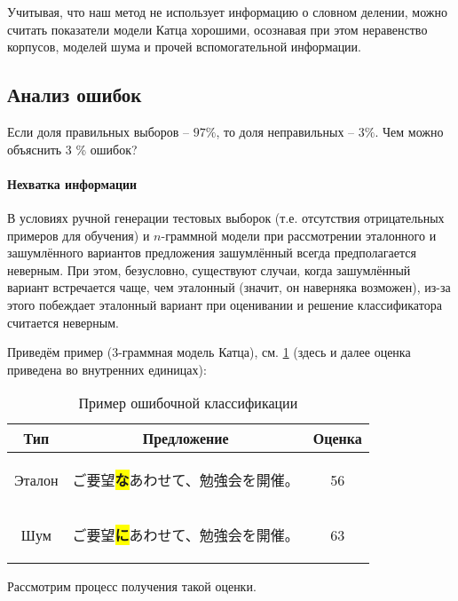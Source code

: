 Учитывая, что наш метод не использует информацию о словном делении, можно считать показатели модели Катца хорошими, осознавая при этом  неравенство корпусов, моделей шума и прочей вспомогательной информации.

\subsection{ Анализ ошибок }

Если доля правильных выборов -- $97 \%$, то доля неправильных -- $3 \%$. Чем можно объяснить 3 \% ошибок?

\paragraph{ Нехватка информации } В условиях ручной генерации тестовых выборок (т.е. отсутствия отрицательных примеров для обучения) и $n$-граммной модели при рассмотрении эталонного и зашумлённого вариантов предложения зашумлённый всегда предполагается неверным. При этом, безусловно, существуют случаи, когда зашумлённый вариант встречается чаще, чем эталонный (значит, он наверняка возможен), из-за этого побеждает эталонный вариант при оценивании и решение классификатора считается неверным.
	
Приведём пример (3-граммная модель Катца), см. \cref{table:err} (здесь и далее оценка приведена во внутренних единицах): 

\begin{table}[H]
	\begin{center}

\begin{tabular}{|c|c|c|} \hline
	Тип & Предложение & Оценка \\ \hline
	Эталон & \begin{CJK}{UTF8}{min} ご要望\colorbox{yellow}{\textbf{な}}あわせて、勉強会を開催。 \end{CJK} & 56 \\
	Шум & \begin{CJK}{UTF8}{min} ご要望\colorbox{yellow}{\textbf{に}}あわせて、勉強会を開催。 \end{CJK} & 63 \\ \hline
\end{tabular}
\caption{Пример ошибочной классификации}
\label{table:err}
\end{center}
\end{table}

Рассмотрим процесс получения такой оценки.

